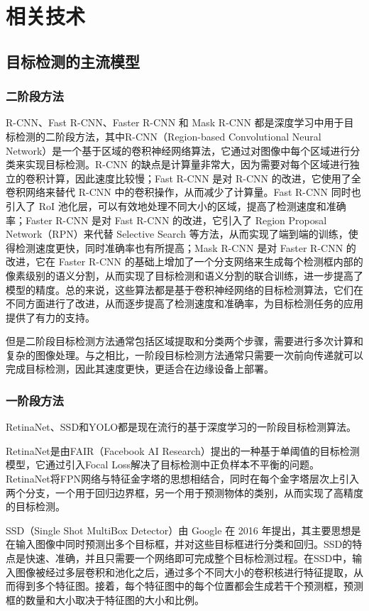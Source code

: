 \documentclass{ctexart}
\numberwithin{equation}{section}%
\numberwithin{figure}{section}%
\numberwithin{table}{section}%
\begin{document}
	\section{相关技术}
	\subsection{目标检测的主流模型}
	\subsubsection{二阶段方法}
	R-CNN、Fast R-CNN、Faster R-CNN 和 Mask R-CNN 都是深度学习中用于目标检测的二阶段方法，其中R-CNN（Region-based Convolutional Neural Network）是一个基于区域的卷积神经网络算法，它通过对图像中每个区域进行分类来实现目标检测。R-CNN 的缺点是计算量非常大，因为需要对每个区域进行独立的卷积计算，因此速度比较慢；Fast R-CNN 是对 R-CNN 的改进，它使用了全卷积网络来替代 R-CNN 中的卷积操作，从而减少了计算量。Fast R-CNN 同时也引入了 RoI 池化层，可以有效地处理不同大小的区域，提高了检测速度和准确率；Faster R-CNN 是对 Fast R-CNN 的改进，它引入了 Region Proposal Network（RPN）来代替 Selective Search 等方法，从而实现了端到端的训练，使得检测速度更快，同时准确率也有所提高；Mask R-CNN 是对 Faster R-CNN 的改进，它在 Faster R-CNN 的基础上增加了一个分支网络来生成每个检测框内部的像素级别的语义分割，从而实现了目标检测和语义分割的联合训练，进一步提高了模型的精度。总的来说，这些算法都是基于卷积神经网络的目标检测算法，它们在不同方面进行了改进，从而逐步提高了检测速度和准确率，为目标检测任务的应用提供了有力的支持。
	
	但是二阶段目标检测方法通常包括区域提取和分类两个步骤，需要进行多次计算和复杂的图像处理。与之相比，一阶段目标检测方法通常只需要一次前向传递就可以完成目标检测，因此其速度更快，更适合在边缘设备上部署。
	
	\subsubsection{一阶段方法}
	RetinaNet\textsuperscript{\cite{26}}、SSD和YOLO都是现在流行的基于深度学习的一阶段目标检测算法。
	
	RetinaNet是由FAIR（Facebook AI Research）提出的一种基于单阈值的目标检测模型，它通过引入Focal Loss解决了目标检测中正负样本不平衡的问题。RetinaNet将FPN网络与特征金字塔的思想相结合，同时在每个金字塔层次上引入两个分支，一个用于回归边界框，另一个用于预测物体的类别，从而实现了高精度的目标检测。
	
	SSD（Single Shot MultiBox Detector）由 Google 在 2016 年提出，其主要思想是在输入图像中同时预测出多个目标框，并对这些目标框进行分类和回归。SSD的特点是快速、准确，并且只需要一个网络即可完成整个目标检测过程。在SSD中，输入图像被经过多层卷积和池化之后，通过多个不同大小的卷积核进行特征提取，从而得到多个特征图。接着，每个特征图中的每个位置都会生成若干个预测框，预测框的数量和大小取决于特征图的大小和比例。
	
\end{document}
